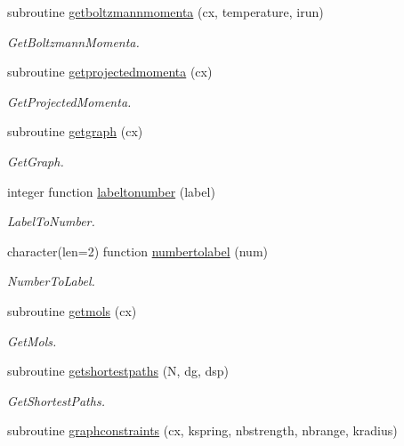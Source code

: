 \begin{DoxyCompactItemize}
subroutine \mbox{\hyperlink{namespacechemstr_aaedb8aee0c6350f7609bd0a32926ee7f}{getboltzmannmomenta}} (cx, temperature, irun)
\begin{DoxyCompactList}\small\item\em Get\+Boltzmann\+Momenta. \end{DoxyCompactList}\item 
subroutine \mbox{\hyperlink{namespacechemstr_a8f2832c53773ad18eadd995ec383cda8}{getprojectedmomenta}} (cx)
\begin{DoxyCompactList}\small\item\em Get\+Projected\+Momenta. \end{DoxyCompactList}\item 
subroutine \mbox{\hyperlink{namespacechemstr_abb28977af5498456e127ef24a4398aad}{getgraph}} (cx)
\begin{DoxyCompactList}\small\item\em Get\+Graph. \end{DoxyCompactList}\item 
integer function \mbox{\hyperlink{namespacechemstr_a7f2ae90cc1ce50d3b46f045b46147e23}{labeltonumber}} (label)
\begin{DoxyCompactList}\small\item\em Label\+To\+Number. \end{DoxyCompactList}\item 
character(len=2) function \mbox{\hyperlink{namespacechemstr_aa1abd301519206cbfe3d966c11a9b73b}{numbertolabel}} (num)
\begin{DoxyCompactList}\small\item\em Number\+To\+Label. \end{DoxyCompactList}\item 
subroutine \mbox{\hyperlink{namespacechemstr_a6c05b1170d09857c530676740c349725}{getmols}} (cx)
\begin{DoxyCompactList}\small\item\em Get\+Mols. \end{DoxyCompactList}\item 
subroutine \mbox{\hyperlink{namespacechemstr_a20710db5ffd66de18dfaad9f0e9c821a}{getshortestpaths}} (N, dg, dsp)
\begin{DoxyCompactList}\small\item\em Get\+Shortest\+Paths. \end{DoxyCompactList}\item 
subroutine \mbox{\hyperlink{namespacechemstr_a38779fdbd95d7cfe9b20a456d704f37d}{graphconstraints}} (cx, kspring, nbstrength, nbrange, kradius)

\end{DoxyCompactItemize}
